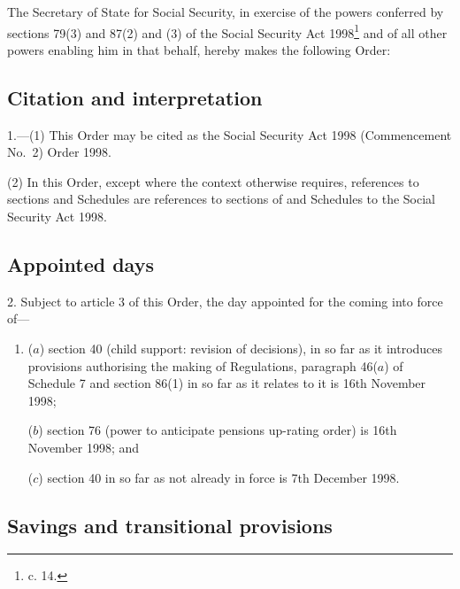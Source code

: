 \documentclass[12pt,a4paper]{article}
\title{\regstitle}
\author{S.I. 1998 No. 2780 (C.66)}
\date{Made 12th November 1998}
\begin{document}
\maketitle

\noindent
The Secretary of State for Social Security, in exercise of the powers conferred by sections 79(3) and 87(2) and (3) of the Social Security Act 1998\footnote{ c. 14.}
 and of all other powers enabling him in that behalf, hereby makes the following Order:

{\sloppy

\tableofcontents

}

\bigskip

\setcounter{secnumdepth}{-2}

\subsection[1. Citation and interpretation]{Citation and interpretation}

1.—(1) This Order may be cited as the Social Security Act 1998 (Commencement No.\ 2) Order 1998.

(2) In this Order, except where the context otherwise requires, references to sections and Schedules are references to sections of and Schedules to the Social Security Act 1998.

\subsection[2. Appointed days]{Appointed days}

2.  Subject to article 3 of this Order, the day appointed for the coming into force of---
\begin{enumerate}\item[]
($a$) section 40 (child support: revision of decisions), in so far as it introduces provisions authorising the making of Regulations, paragraph 46($a$) of Schedule 7 and section 86(1) in so far as it relates to it is 16th November 1998;

($b$) section 76 (power to anticipate pensions up-rating order) is 16th November 1998; and

($c$) section 40 in so far as not already in force is 7th December 1998.
\end{enumerate}

\subsection[3. Savings and transitional provisions]{Savings and transitional provisions}
\end{document}
